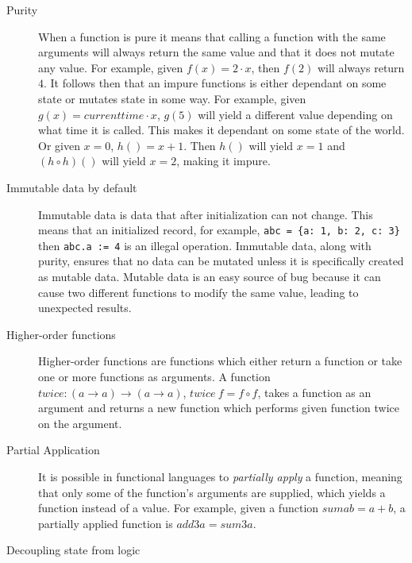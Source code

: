 \begin{description}
\item[ Purity ]

When a function is pure it means that calling a function with the same arguments
        will always return the same value and that it does not mutate any value.
        For example, given $f(x) = 2\cdot x$, then $f(2)$ will always
        return $4$. It follows then that an impure functions is either dependant
        on some state or mutates state in some way. For example, given $g(x) =
        currenttime \cdot x$, $g(5)$ will yield a different value depending on
        what time it is called. This makes it dependant on some state of the
        world. Or given $x=0$, $h()=x+1$. Then $h()$ will yield $x=1$ and $(h
        \circ h)()$ will yield $x=2$, making it impure.~\cite{hughes1989functional}

\item[ Immutable data by default ]

Immutable data is data that after initialization can not change. This means that
an initialized record, for example, \texttt{abc = \{a: 1, b: 2, c: 3\}} then
\texttt{abc.a := 4} is an illegal operation. Immutable data, along with purity,
ensures that no data can be mutated unless it is specifically created as mutable
data.  Mutable data is an easy source of bug because it can cause two different
functions to modify the same value, leading to unexpected results.

\item[Higher-order functions]

	Higher-order functions are functions which either return a function or take
one or more functions as arguments. A function $twice : (a\rightarrow
a)\rightarrow (a\rightarrow a)$, $twice\ f = f \circ f$, takes a function as an
argument and returns a new function which performs given function twice on the
argument. 

\item[Partial Application] 
    It is possible in functional languages to \textit{partially apply} a
    function, meaning that only some of the function's arguments are supplied,
    which yields a function instead of a value. For example, given a function
    $sum a b = a + b$, a partially applied function is $add3 a = sum 3 a$. 

\item[Decoupling state from logic]


\end{description}
